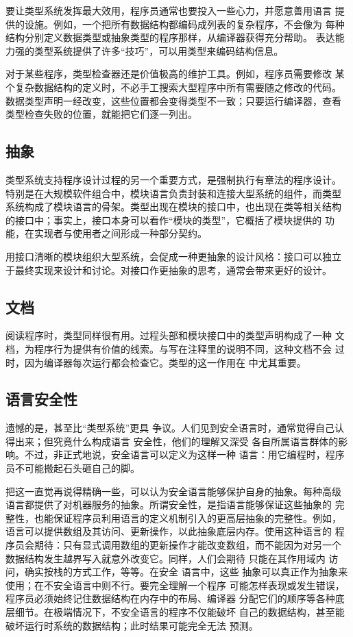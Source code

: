 要让类型系统发挥最大效用，程序员通常也要投入一些心力，并愿意善用语言
提供的设施。例如，一个把所有数据结构都编码成列表的复杂程序，不会像为
每种结构分别定义数据类型或抽象类型的程序那样，从编译器获得充分帮助。
表达能力强的类型系统提供了许多“技巧”，可以用类型来编码结构信息。

对于某些程序，类型检查器还是价值极高的维护工具。例如，程序员需要修改
某个复杂数据结构的定义时，不必手工搜索大型程序中所有需要随之修改的代码。
数据类型声明一经改变，这些位置都会变得类型不一致；只要运行编译器，查看
类型检查失败的位置，就能把它们逐一列出。

\subsection*{抽象}

类型系统支持程序设计过程的另一个重要方式，是强制执行有章法的程序设计。
特别是在大规模软件组合中，模块语言负责封装和连接大型系统的组件，而类型
系统构成了模块语言的骨架。类型出现在模块的接口中，也出现在类等相关结构
的接口中；事实上，接口本身可以看作“模块的类型”，它概括了模块提供的
功能，在实现者与使用者之间形成一种部分契约。

用接口清晰的模块组织大型系统，会促成一种更抽象的设计风格：接口可以独立
于最终实现来设计和讨论。对接口作更抽象的思考，通常会带来更好的设计。

\subsection*{文档}

阅读程序时，类型同样很有用。过程头部和模块接口中的类型声明构成了一种
文档，为程序行为提供有价值的线索。与写在注释里的说明不同，这种文档不会
过时，因为编译器每次运行都会检查它。类型的这一作用在
中尤其重要。

\subsection*{语言安全性}

遗憾的是，甚至比“类型系统”更具
争议。人们见到安全语言时，通常觉得自己认得出来；但究竟什么构成语言
安全性，他们的理解又深受
各自所属语言群体的影响。不过，非正式地说，安全语言可以定义为这样一种
语言：用它编程时，程序员不可能搬起石头砸自己的脚。

把这一直觉再说得精确一些，可以认为安全语言能够保护自身的抽象。每种高级
语言都提供了对机器服务的抽象。所谓安全性，是指语言能够保证这些抽象的
完整性，也能保证程序员利用语言的定义机制引入的更高层抽象的完整性。例如，
语言可以提供数组及其访问、更新操作，以此抽象底层内存。使用这种语言的
程序员会期待：只有显式调用数组的更新操作才能改变数组，而不能因为对另一个
数据结构发生越界写入就意外改变它。同样，人们会期待
只能在其作用域内
访问，确实按栈的方式工作，等等。在安全
语言中，这些
抽象可以真正作为抽象来使用；在不安全语言中则不行。要完全理解一个程序
可能怎样表现或发生错误，程序员必须始终记住数据结构在内存中的布局、编译器
分配它们的顺序等各种底层细节。在极端情况下，不安全语言的程序不仅能破坏
自己的数据结构，甚至能破坏运行时系统的数据结构；此时结果可能完全无法
预测。

